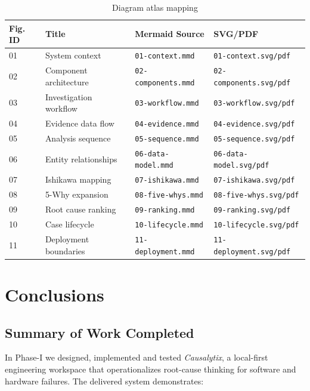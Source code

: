 \documentclass[12pt,a4paper,oneside]{report}
\begin{document}
\begin{table}[H]
\centering
\caption{Diagram atlas mapping} \label{tab:figmap}
\begin{tabular}{p{2.2cm} p{4.5cm} p{4cm} p{3.2cm}}
\toprule
\textbf{Fig. ID} & \textbf{Title} & \textbf{Mermaid Source} & \textbf{SVG/PDF}\\
\midrule
01 & System context & \texttt{01-context.mmd} & \texttt{01-context.svg/pdf}\\
02 & Component architecture & \texttt{02-components.mmd} & \texttt{02-components.svg/pdf}\\
03 & Investigation workflow & \texttt{03-workflow.mmd} & \texttt{03-workflow.svg/pdf}\\
04 & Evidence data flow & \texttt{04-evidence.mmd} & \texttt{04-evidence.svg/pdf}\\
05 & Analysis sequence & \texttt{05-sequence.mmd} & \texttt{05-sequence.svg/pdf}\\
06 & Entity relationships & \texttt{06-data-model.mmd} & \texttt{06-data-model.svg/pdf}\\
07 & Ishikawa mapping & \texttt{07-ishikawa.mmd} & \texttt{07-ishikawa.svg/pdf}\\
08 & 5-Why expansion & \texttt{08-five-whys.mmd} & \texttt{08-five-whys.svg/pdf}\\
09 & Root cause ranking & \texttt{09-ranking.mmd} & \texttt{09-ranking.svg/pdf}\\
10 & Case lifecycle & \texttt{10-lifecycle.mmd} & \texttt{10-lifecycle.svg/pdf}\\
11 & Deployment boundaries & \texttt{11-deployment.mmd} & \texttt{11-deployment.svg/pdf}\\
\bottomrule
\end{tabular}
\end{table}

\chapter{Conclusions}
\label{ch:conclusions}

\section{Summary of Work Completed}
In Phase-I we designed, implemented and tested \textit{Causalytix}, a local-first engineering workspace that operationalizes root-cause thinking for software and hardware failures. The delivered system demonstrates:
\end{document}
